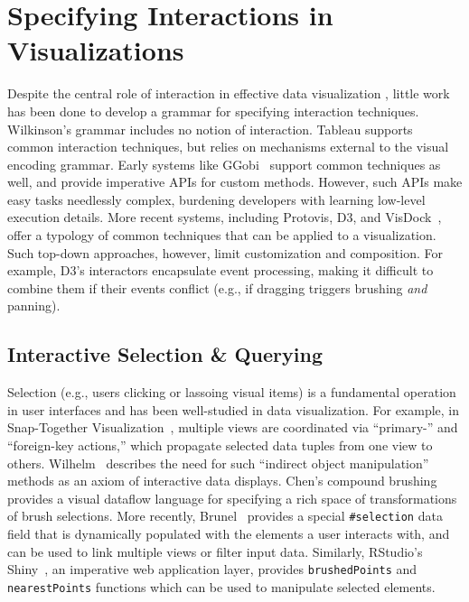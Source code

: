 \vspace{-10pt}

\section{Specifying Interactions in Visualizations}

Despite the central role of interaction in effective data visualization
\cite{heer:dynamics, pike:interactionscience}, little work has been done to
develop a grammar for specifying interaction techniques. Wilkinson's grammar
includes no notion of interaction. Tableau supports common interaction
techniques, but relies on mechanisms external to the visual encoding grammar.
Early systems like GGobi~\cite{swayne:ggobi} support common techniques as well,
and provide imperative APIs for custom methods. However, such APIs make easy
tasks needlessly complex, burdening developers with learning low-level execution
details. More recent systems, including Protovis, D3, and
VisDock~\cite{choi:visdock}, offer a typology of common techniques that can be
applied to a visualization. Such top-down approaches, however, limit
customization and composition. For example, D3's interactors encapsulate event
processing, making it difficult to combine them if their events conflict (e.g.,
if dragging triggers brushing \emph{and} panning).

\subsection{Interactive Selection \& Querying}

Selection (e.g., users clicking or lassoing visual items) is a fundamental
operation in user interfaces and has been well-studied in data visualization.
For example, in Snap-Together Visualization~\cite{north:snap}, multiple views
are coordinated via ``primary-'' and ``foreign-key actions,'' which propagate
selected data tuples from one view to others. Wilhelm~\cite{wilhelm:interaction}
describes the need for such ``indirect object manipulation'' methods as an axiom
of interactive data displays. Chen's compound brushing~\cite{chen:compound}
provides a visual dataflow language for specifying a rich space of
transformations of brush selections.  More recently, Brunel~\cite{brunel}
provides a special \texttt{\#selection} data field that is dynamically populated
with the elements a user interacts with, and can be used to link multiple views
or filter input data. Similarly, RStudio's Shiny~\cite{shiny}, an imperative web
application layer, provides \texttt{brushedPoints} and \texttt{nearestPoints}
functions which can be used to manipulate selected elements.

